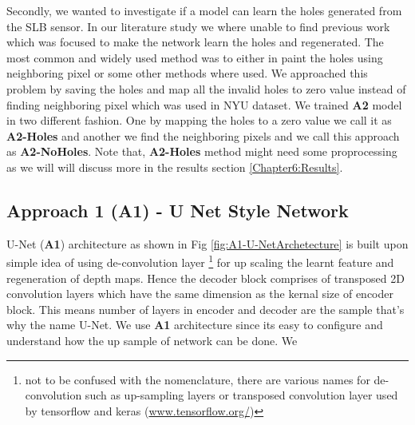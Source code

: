 Secondly, we wanted to investigate if a model can learn the holes generated from the SLB sensor. In our literature study we where unable to find previous work which was focused to make the network learn the holes and regenerated. The most common and widely used method was to either in paint the holes using neighboring pixel \cite{silberman11indoor} or some other methods where used. We approached this problem by saving the holes and map all the invalid holes to zero value instead of finding neighboring pixel which was used in NYU dataset. We trained \textbf{A2} model in two different fashion. One by mapping the holes to a zero value we call it as \textbf{A2-Holes} and another we find the neighboring pixels and we call this approach as \textbf{A2-NoHoles}. Note that, \textbf{A2-Holes} method might need some proprocessing as we will will discuss more in the results section \ref{Chapter6:Results}.








\subsection{Approach 1 (A1) - U Net Style Network}
U-Net (\textbf{A1}) architecture as shown in Fig \ref{fig:A1-U-NetArchetecture} is built upon simple idea of using de-convolution layer  \footnote{not to be confused with the nomenclature, there are various names for de-convolution such as up-sampling layers or transposed convolution layer used by tensorflow and keras (\url{www.tensorflow.org/})} for up scaling the learnt feature and regeneration of depth maps. Hence the decoder block comprises of transposed 2D convolution layers which have the same dimension as the kernal size of encoder block. This means number of layers in encoder and decoder are the sample that's why the name U-Net. We use \textbf{A1} architecture since its easy to configure and understand how the up sample of network can be done. We 

